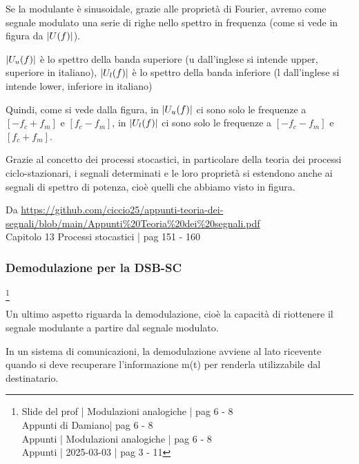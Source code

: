 Se la modulante è sinusoidale, grazie alle proprietà di Fourier, avremo come segnale modulato una serie di righe nello spettro in frequenza (come si vede in figura da $\abs{U(f)}$). \newline 

$\abs{U_u (f)}$ è lo spettro della banda superiore (u dall'inglese si intende upper, superiore in italiano), 
$\abs{U_l (f)}$ è lo spettro della banda inferiore (l dall'inglese si intende lower, inferiore in italiano) 

Quindi, come si vede dalla figura, in $\abs{U_u (f)}$ ci sono solo le frequenze a $[-f_c + f_m]$ e $[f_c - f_m]$, 
in $\abs{U_l (f)}$ ci sono solo le frequenze a $[-f_c - f_m]$ e $[f_c + f_m]$. \newline 

Grazie al concetto dei processi stocastici, in particolare della teoria dei processi ciclo-stazionari, i segnali determinati e le loro proprietà si estendono anche ai segnali di spettro di potenza, 
cioè quelli che abbiamo visto in figura. \newline 

\begin{tcolorbox}
    
    Da \url{https://github.com/ciccio25/appunti-teoria-dei-segnali/blob/main/Appunti%20Teoria%20dei%20segnali.pdf} \\
    Capitolo 13 Processi stocastici | pag 151 - 160 \newline

\end{tcolorbox}

\newpage 

\subsubsection{Demodulazione per la DSB-SC}
\footnote{Slide del prof | Modulazioni analogiche | pag 6 - 8\\  
Appunti di Damiano| pag 6 - 8\\
Appunti | Modulazioni analogiche | pag 6 - 8 \\
Appunti | 2025-03-03 | pag 3 - 11
} 

Un ultimo aspetto riguarda la demodulazione, cioè la capacità di riottenere il segnale modulante a partire dal segnale modulato. \newline 

In un sistema di comunicazioni, la demodulazione avviene al lato ricevente quando si deve recuperare l'informazione m(t) per renderla utilizzabile dal destinatario. \newline 

